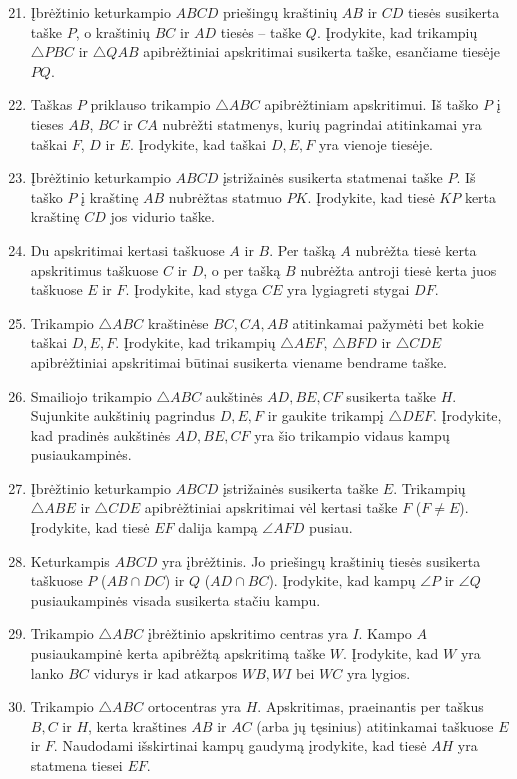 \documentclass[11pt,a4paper]{scrartcl}
\begin{document}
\begin{enumerate}
    \setcounter{enumi}{20}
    \item Įbrėžtinio keturkampio $ABCD$ priešingų kraštinių $AB$ ir $CD$ tiesės susikerta taške $P$, o kraštinių $BC$ ir $AD$ tiesės – taške $Q$. Įrodykite, kad trikampių $\triangle PBC$ ir $\triangle QAB$ apibrėžtiniai apskritimai susikerta taške, esančiame tiesėje $PQ$.
    \item Taškas $P$ priklauso trikampio $\triangle ABC$ apibrėžtiniam apskritimui. Iš taško $P$ į tieses $AB$, $BC$ ir $CA$ nubrėžti statmenys, kurių pagrindai atitinkamai yra taškai $F$, $D$ ir $E$. Įrodykite, kad taškai $D, E, F$ yra vienoje tiesėje.
    \item Įbrėžtinio keturkampio $ABCD$ įstrižainės susikerta statmenai taške $P$. Iš taško $P$ į kraštinę $AB$ nubrėžtas statmuo $PK$. Įrodykite, kad tiesė $KP$ kerta kraštinę $CD$ jos vidurio taške.
    \item Du apskritimai kertasi taškuose $A$ ir $B$. Per tašką $A$ nubrėžta tiesė kerta apskritimus taškuose $C$ ir $D$, o per tašką $B$ nubrėžta antroji tiesė kerta juos taškuose $E$ ir $F$. Įrodykite, kad styga $CE$ yra lygiagreti stygai $DF$.
    \item Trikampio $\triangle ABC$ kraštinėse $BC, CA, AB$ atitinkamai pažymėti bet kokie taškai $D, E, F$. Įrodykite, kad trikampių $\triangle AEF$, $\triangle BFD$ ir $\triangle CDE$ apibrėžtiniai apskritimai būtinai susikerta viename bendrame taške.
    \item Smailiojo trikampio $\triangle ABC$ aukštinės $AD, BE, CF$ susikerta taške $H$. Sujunkite aukštinių pagrindus $D, E, F$ ir gaukite trikampį $\triangle DEF$. Įrodykite, kad pradinės aukštinės $AD, BE, CF$ yra šio trikampio vidaus kampų pusiaukampinės.
    \item Įbrėžtinio keturkampio $ABCD$ įstrižainės susikerta taške $E$. Trikampių $\triangle ABE$ ir $\triangle CDE$ apibrėžtiniai apskritimai vėl kertasi taške $F$ ($F \neq E$). Įrodykite, kad tiesė $EF$ dalija kampą $\angle AFD$ pusiau.
    \item Keturkampis $ABCD$ yra įbrėžtinis. Jo priešingų kraštinių tiesės susikerta taškuose $P$ ($AB \cap DC$) ir $Q$ ($AD \cap BC$). Įrodykite, kad kampų $\angle P$ ir $\angle Q$ pusiaukampinės visada susikerta stačiu kampu.
    \item Trikampio $\triangle ABC$ įbrėžtinio apskritimo centras yra $I$. Kampo $A$ pusiaukampinė kerta apibrėžtą apskritimą taške $W$. Įrodykite, kad $W$ yra lanko $BC$ vidurys ir kad atkarpos $WB, WI$ bei $WC$ yra lygios.
    \item Trikampio $\triangle ABC$ ortocentras yra $H$. Apskritimas, praeinantis per taškus $B, C$ ir $H$, kerta kraštines $AB$ ir $AC$ (arba jų tęsinius) atitinkamai taškuose $E$ ir $F$. Naudodami išskirtinai kampų gaudymą įrodykite, kad tiesė $AH$ yra statmena tiesei $EF$.
\end{enumerate}
\end{document}
